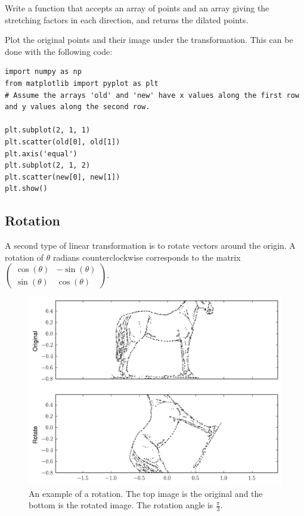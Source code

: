 \begin{problem}
Write a function that accepts an array of points and an array giving the stretching factors in each direction, and returns the dilated points. 

Plot the original points and their image under the transformation. This can be done with the following code:
\begin{lstlisting}
import numpy as np
from matplotlib import pyplot as plt
# Assume the arrays 'old' and 'new' have x values along the first row and y values along the second row.

plt.subplot(2, 1, 1)
plt.scatter(old[0], old[1])
plt.axis('equal')
plt.subplot(2, 1, 2)
plt.scatter(new[0], new[1])
plt.show()
\end{lstlisting}
\end{problem}

\subsection*{Rotation}
A second type of linear transformation is to rotate vectors around the origin. A rotation of $\theta$ radians counterclockwise corresponds to the matrix $\begin{pmatrix}
\cos(\theta) & -\sin(\theta) \\
\sin(\theta) & \cos(\theta)
\end{pmatrix}.$

\begin{figure}
\includegraphics[width=\textwidth]{rotate.pdf}
\caption{An example of a rotation.
The top image is the original and the bottom is the rotated image.
The rotation angle is $\frac{\pi}{3}$.}
\label{basis:rotate}
\end{figure}

